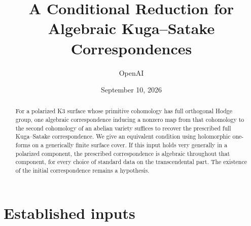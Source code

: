 \documentclass[11pt]{article}
\title{A Conditional Reduction for Algebraic Kuga--Satake Correspondences}
\author{OpenAI}
\date{September 10, 2026}
\theoremstyle{definition}
\theoremstyle{remark}
\numberwithin{equation}{section}
\begin{document}
\maketitle
\begin{abstract}
For a polarized K3 surface whose primitive cohomology has full orthogonal Hodge group, one algebraic correspondence inducing a nonzero map from that cohomology to the second cohomology of an abelian variety suffices to recover the prescribed full Kuga--Satake correspondence. We give an equivalent condition using holomorphic one-forms on a generically finite surface cover. If this input holds very generally in a polarized component, the prescribed correspondence is algebraic throughout that component, for every choice of standard data on the transcendental part. The existence of the initial correspondence remains a hypothesis.
\end{abstract}
\tableofcontents
\newpage







\appendix
\section{Established inputs}\label{app:dependencies}


\end{document}
